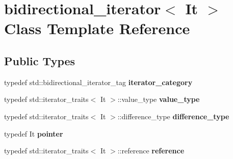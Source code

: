 \hypertarget{classbidirectional__iterator}{}\section{bidirectional\+\_\+iterator$<$ It $>$ Class Template Reference}
\label{classbidirectional__iterator}
\subsection*{Public Types}
\begin{DoxyCompactItemize}
\item 
\mbox{\label{classbidirectional__iterator_ac9c9756bfba42dec36c1c7b942f3df5f}} 
typedef std\+::bidirectional\+\_\+iterator\+\_\+tag {\bfseries iterator\+\_\+category}
\item 
\mbox{\label{classbidirectional__iterator_a4c1a6a040663fcb45383fb8ba0a0c50a}} 
typedef std\+::iterator\+\_\+traits$<$ It $>$\+::value\+\_\+type {\bfseries value\+\_\+type}
\item 
\mbox{\label{classbidirectional__iterator_a567c0d6ba507b7024d271c4f14946e69}} 
typedef std\+::iterator\+\_\+traits$<$ It $>$\+::difference\+\_\+type {\bfseries difference\+\_\+type}
\item 
\mbox{\label{classbidirectional__iterator_a36caf53d9dda4ea22374e633d9bd87a9}} 
typedef It {\bfseries pointer}
\item 
\mbox{\label{classbidirectional__iterator_a855d3d40e8216568adac09510ef5a7d5}} 
typedef std\+::iterator\+\_\+traits$<$ It $>$\+::reference {\bfseries reference}
\end{DoxyCompactItemize}
